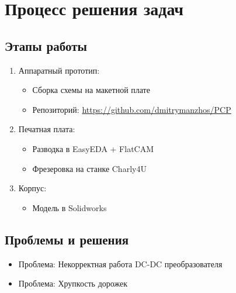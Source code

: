 \documentclass[a4paper,12pt]{article}
\begin{document}

\section{Процесс решения задач}
\subsection{Этапы работы}
\begin{enumerate}
    \item Аппаратный прототип:
    \begin{itemize}
        \item Сборка схемы на макетной плате
        \item Репозиторий: \url{https://github.com/dmitrymanzhos/PCP}
    \end{itemize}
    
    \item Печатная плата:
    \begin{itemize}
        \item Разводка в EasyEDA + FlatCAM
        \item Фрезеровка на станке Charly4U
    \end{itemize}
    
    \item Корпус:
    \begin{itemize}
        \item Модель в Solidworks
    \end{itemize}
\end{enumerate}

\subsection{Проблемы и решения}
\begin{itemize}
    \item {Проблема:} Некорректная работа DC-DC преобразователя \\
    
    \item {Проблема:} Хрупкость дорожек \\
\end{itemize}
\end{document}
